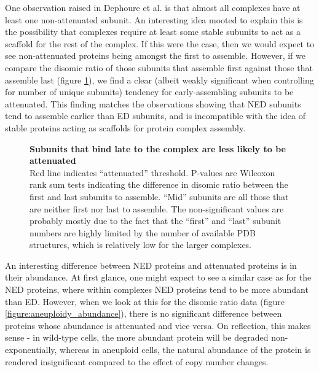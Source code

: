 \documentclass[a4paper,11pt,twoside,openright]{scrbook}
\begin{document}
One observation raised in Dephoure et al. is that almost all complexes have at least one non-attenuated subunit. An interesting idea mooted to explain this is the possibility that complexes require at least some stable subunits to act as a scaffold for the rest of the complex. If this were the case, then we would expect to see non-attenuated proteins being amongst the first to assemble. However, if we compare the disomic ratio of those subunits that assemble first against those that assemble last (figure \ref{figure:aneuploidy_assembly}), we find a clear (albeit weakly significant when controlling for number of unique subunits) tendency for early-assembling subunits to be attenuated. This finding matches the observations showing that NED subunits tend to assemble earlier than ED subunits, and is incompatible with the idea of stable proteins acting as scaffolds for protein complex assembly.

\begin{figure}[h]
    \caption[Subunits that bind late to the complex are less likely to be attenuated]{\sffamily \textbf{Subunits that bind late to the complex are less likely to be attenuated} \\ \small Red line indicates “attenuated” threshold. P-values are Wilcoxon rank sum tests indicating the difference in disomic ratio between the first and last subunits to assemble. “Mid” subunits are all those that are neither first nor last to assemble. The non-significant values are probably mostly due to the fact that the “first” and “last” subunit numbers are highly limited by the number of available PDB structures, which is relatively low for the larger complexes.}
    \label{figure:aneuploidy_assembly}
\end{figure}

An interesting difference between NED proteins and attenuated proteins is in their abundance. At first glance, one might expect to see a similar case as for the NED proteins, where within complexes NED proteins tend to be more abundant than ED. However, when we look at this for the disomic ratio data (figure \ref{figure:aneuploidy_abundance}), there is no significant difference between proteins whose abundance is attenuated and vice versa. On reflection, this makes sense - in wild-type cells, the more abundant protein will be degraded non-exponentially, whereas in aneuploid cells, the natural abundance of the protein is rendered insignificant compared to the effect of copy number changes.
\end{document}
